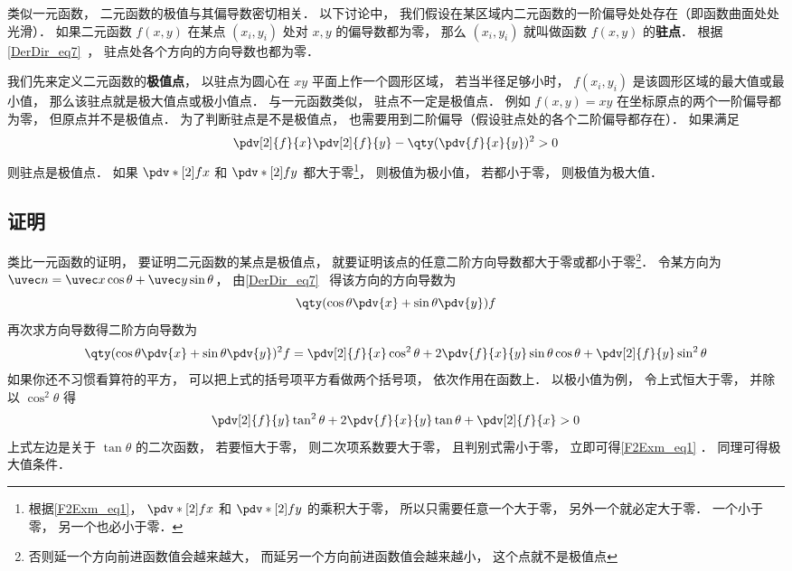 
类似一元函数， 二元函数的极值与其偏导数密切相关． 以下讨论中， 我们假设在某区域内二元函数的一阶偏导处处存在（即函数曲面处处光滑）． 如果二元函数 $f(x,y)$ 在某点 $(x_i, y_i)$ 处对 $x, y$ 的偏导数都为零， 那么 $(x_i, y_i)$ 就叫做函数 $f(x,y)$ 的\textbf{驻点}． 根据\autoref{DerDir_eq7}~， 驻点处各个方向的方向导数也都为零．

我们先来定义二元函数的\textbf{极值点}， 以驻点为圆心在 $xy$ 平面上作一个圆形区域， 若当半径足够小时， $f(x_i, y_i)$ 是该圆形区域的最大值或最小值， 那么该驻点就是极大值点或极小值点． 与一元函数类似， 驻点不一定是极值点． 例如 $f(x,y) = xy$ 在坐标原点的两个一阶偏导都为零， 但原点并不是极值点． 为了判断驻点是不是极值点， 也需要用到二阶偏导（假设驻点处的各个二阶偏导都存在）． 如果满足
\begin{equation}\label{F2Exm_eq1}
\pdv[2]{f}{x}\pdv[2]{f}{y} - \qty(\pdv{f}{x}{y})^2 > 0
\end{equation}
则驻点是极值点． 如果 $\pdv*[2]{f}{x}$ 和 $\pdv*[2]{f}{y}$ 都大于零\footnote{根据\autoref{F2Exm_eq1}， $\pdv*[2]{f}{x}$ 和 $\pdv*[2]{f}{y}$ 的乘积大于零， 所以只需要任意一个大于零， 另外一个就必定大于零． 一个小于零， 另一个也必小于零．}， 则极值为极小值， 若都小于零， 则极值为极大值．

\subsection{证明}

类比一元函数的证明， 要证明二元函数的某点是极值点， 就要证明该点的任意二阶方向导数都大于零或都小于零\footnote{否则延一个方向前进函数值会越来越大， 而延另一个方向前进函数值会越来越小， 这个点就不是极值点}． 令某方向为 $\uvec n = \uvec x \cos\theta + \uvec y \sin\theta$， 由\autoref{DerDir_eq7}~ 得该方向的方向导数为
\begin{equation}
\qty(\cos\theta\pdv{x} + \sin\theta\pdv{y}) f
\end{equation}
再次求方向导数得二阶方向导数为
\begin{equation}
\qty(\cos\theta\pdv{x} + \sin\theta\pdv{y})^2 f
= \pdv[2]{f}{x} \cos^2\theta + 2\pdv{f}{x}{y} \sin\theta\cos\theta + \pdv[2]{f}{y} \sin^2\theta
\end{equation}
如果你还不习惯看算符的平方， 可以把上式的括号项平方看做两个括号项， 依次作用在函数上． 以极小值为例， 令上式恒大于零， 并除以 $\cos^2\theta$ 得
\begin{equation}
\pdv[2]{f}{y} \tan^2\theta + 2\pdv{f}{x}{y} \tan\theta + \pdv[2]{f}{x} > 0
\end{equation}
上式左边是关于 $\tan\theta$ 的二次函数， 若要恒大于零， 则二次项系数要大于零， 且判别式需小于零， 立即可得\autoref{F2Exm_eq1} ． 同理可得极大值条件．
